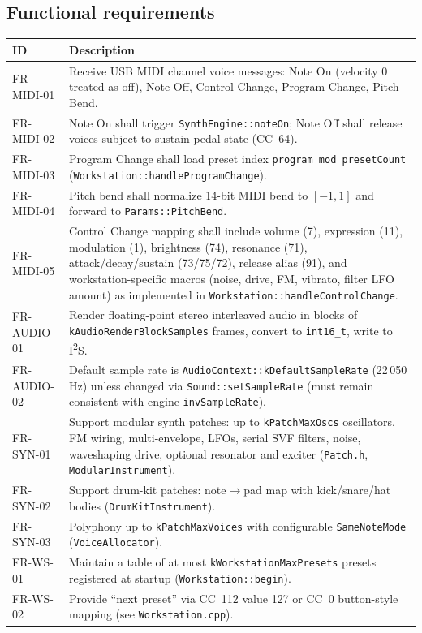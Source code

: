 \documentclass[11pt,a4paper]{article}
\begin{document}
\subsection{Functional requirements}
\begin{longtable}{p{}p{}}
\toprule
\textbf{ID} & \textbf{Description} \\
\midrule
\endhead
FR-MIDI-01 &
Receive USB MIDI channel voice messages: Note On (velocity 0 treated as off), Note Off, Control Change, Program Change, Pitch Bend. \\
FR-MIDI-02 &
Note On shall trigger \texttt{SynthEngine::noteOn}; Note Off shall release voices subject to sustain pedal state (CC~64). \\
FR-MIDI-03 &
Program Change shall load preset index \texttt{program mod presetCount} (\texttt{Workstation::handleProgramChange}). \\
FR-MIDI-04 &
Pitch bend shall normalize 14-bit MIDI bend to $[-1,1]$ and forward to \texttt{Params::PitchBend}. \\
FR-MIDI-05 &
Control Change mapping shall include volume (7), expression (11), modulation (1), brightness (74), resonance (71), attack/decay/sustain (73/75/72), release alias (91), and workstation-specific macros (noise, drive, FM, vibrato, filter LFO amount) as implemented in \texttt{Workstation::handleControlChange}. \\
FR-AUDIO-01 &
Render floating-point stereo interleaved audio in blocks of \texttt{kAudioRenderBlockSamples} frames, convert to \texttt{int16\_t}, write to I\textsuperscript{2}S. \\
FR-AUDIO-02 &
Default sample rate is \texttt{AudioContext::kDefaultSampleRate} (22\,050\,Hz) unless changed via \texttt{Sound::setSampleRate} (must remain consistent with engine \texttt{invSampleRate}). \\
FR-SYN-01 &
Support modular synth patches: up to \texttt{kPatchMaxOscs} oscillators, FM wiring, multi-envelope, LFOs, serial SVF filters, noise, waveshaping drive, optional resonator and exciter (\texttt{Patch.h}, \texttt{ModularInstrument}). \\
FR-SYN-02 &
Support drum-kit patches: note$\rightarrow$pad map with kick/snare/hat bodies (\texttt{DrumKitInstrument}). \\
FR-SYN-03 &
Polyphony up to \texttt{kPatchMaxVoices} with configurable \texttt{SameNoteMode} (\texttt{VoiceAllocator}). \\
FR-WS-01 &
Maintain a table of at most \texttt{kWorkstationMaxPresets} presets registered at startup (\texttt{Workstation::begin}). \\
FR-WS-02 &
Provide ``next preset'' via CC~112 value 127 or CC~0 button-style mapping (see \texttt{Workstation.cpp}). \\
\bottomrule
\end{longtable}
\end{document}
